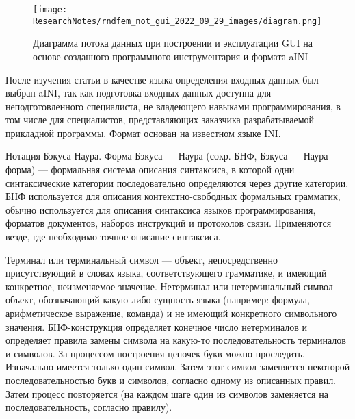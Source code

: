 \begin{figure}[!ht]
  \centering
  \texttt{[image: ResearchNotes/rndfem\_not\_gui\_2022\_09\_29\_images/diagram.png]}
  \caption{Диаграмма потока данных при построении и эксплуатации GUI на основе созданного программного инструментария и формата aINI}
  \label{diagram}
\end{figure}

	После изучения статьи в качестве языка определения входных данных был выбран aINI, так как подготовка входных данных доступна для неподготовленного специалиста, не владеющего навыками программирования, в том числе для специалистов, представляющих заказчика разрабатываемой прикладной программы. Формат основан на известном языке INI.

	Нотация Бэкуса-Наура. Форма Бэкуса — Наура (сокр. БНФ, Бэкуса — Наура форма) — формальная система описания синтаксиса, в которой одни синтаксические категории последовательно определяются через другие категории. БНФ используется для описания контекстно-свободных формальных грамматик, обычно используется для описания синтаксиса языков программирования, форматов документов, наборов инструкций и протоколов связи. Применяются везде, где необходимо точное описание синтаксиса.

	Терминал или терминальный символ — объект, непосредственно присутствующий в словах языка, соответствующего грамматике, и имеющий конкретное, неизменяемое значение. Нетерминал или нетерминальный символ — объект, обозначающий какую-либо сущность языка (например: формула, арифметическое выражение, команда) и не имеющий конкретного символьного значения. БНФ-конструкция определяет конечное число нетерминалов и определяет правила замены символа на какую-то последовательность терминалов и символов. За процессом построения цепочек букв можно проследить. Изначально имеется только один символ. Затем этот символ заменяется некоторой последовательностью букв и символов, согласно одному из описанных правил. Затем процесс повторяется (на каждом шаге один из символов заменяется на последовательность, согласно правилу).
\noteattributes{}

